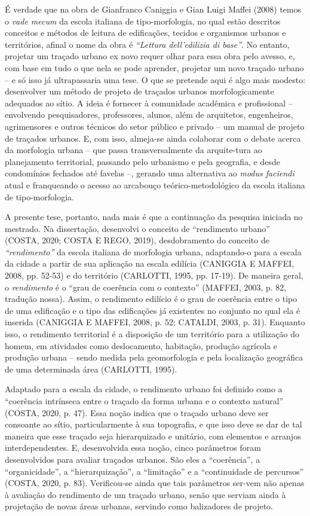 \documentclass[twoside, 12pt]{book}
\begin{document}
         É verdade que na obra de Gianfranco Caniggia e Gian Luigi Maffei (2008) temos o \textit{vade mecum} da escola italiana de tipo-morfologia, no qual estão descritos conceitos e métodos de leitura de edificações, tecidos e organismos urbanos e territórios, afinal o nome da obra é \textit{“Lettura dell’edilizia di base”}. No entanto, projetar um traçado urbano ex novo requer olhar para essa obra pelo avesso, e, com base em tudo o que nela se pode aprender, projetar um novo traçado urbano – e só isso já ultrapassaria uma tese. O que se pretende aqui é algo mais modesto: desenvolver um método de projeto de traçados urbanos morfologicamente adequados ao sítio. A ideia é fornecer à comunidade acadêmica e profissional – envolvendo pesquisadores, professores, alunos, além de arquitetos, engenheiros, agrimensores e outros técnicos do setor público e privado – um manual de projeto de traçados urbanos. E, com isso, almeja-se ainda colaborar com o debate acerca da morfologia urbana – que passa transversalmente da arquite-tura ao planejamento territorial, passando pelo urbanismo e pela geografia, e desde condomínios fechados até favelas –, gerando uma alternativa ao \textit{modus faciendi} atual e franqueando o acesso ao arcabouço teórico-metodológico da escola italiana de tipo-morfologia.

        A presente tese, portanto, nada mais é que a continuação da pesquisa iniciada no mestrado.  Na dissertação, desenvolvi o conceito de “rendimento urbano” (COSTA, 2020; COSTA E REGO, 2019), desdobramento do conceito de \textit{“rendimento”} da escola italiana de morfologia urbana,   adaptando-o para a escala da cidade a partir de sua aplicação na escala edilícia (CANIGGIA E MAFFEI, 2008, pp. 52-53) e do território (CARLOTTI, 1995, pp. 17-19). De maneira geral, o \textit{rendimento} é o “grau de coerência com o contexto” (MAFFEI, 2003, p. 82, tradução nossa). Assim, o rendimento edilício é o grau de coerência entre o tipo  de uma edificação e o tipo das edificações já existentes no conjunto no qual ela é inserida (CANIGGIA E MAFFEI, 2008, p. 52; CATALDI, 2003, p. 31). Enquanto isso, o rendimento territorial é a disposição de um território para a utilização do homem,  em atividades como deslocamento, habitação, produção agrícola e produção urbana – sendo medida pela geomorfologia e pela localização geográfica de uma determinada área  (CARLOTTI, 1995). 

        Adaptado para a escala da cidade, o rendimento urbano foi definido como a “coerência intrínseca entre o traçado da forma urbana e o contexto natural” (COSTA, 2020, p. 47). Essa noção indica que o traçado urbano deve ser consoante ao sítio, particularmente à sua topografia, e que isso deve se dar de tal maneira que esse traçado seja hierarquizado e unitário, com elementos e arranjos interdependentes. E, desenvolvida essa noção, cinco parâmetros foram desenvolvidos para avaliar traçados urbanos. São eles a “coerência”, a “organicidade”, a “hierarquização”, a “limitação” e a “continuidade de percursos” (COSTA, 2020, p. 83). Verificou-se ainda que tais parâmetros ser-vem não apenas à avaliação do rendimento de um traçado urbano, senão que serviam ainda à projetação de novas áreas urbanas, servindo como balizadores de projeto. 
\end{document}
